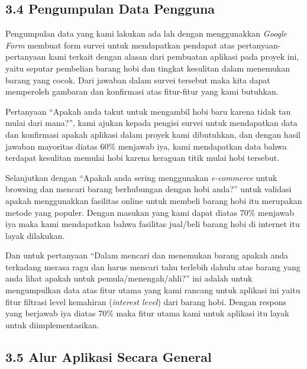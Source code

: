 \documentclass[a4paper]{article}
\begin{document}
\subsection*{3.4 Pengumpulan Data Pengguna}

Pengumpulan data yang kami lakukan ada lah dengan menggunakkan \textit{Google Form} membuat form survei untuk mendapatkan pendapat atas pertanyaan-pertanyaan kami terkait dengan alasan dari pembuatan aplikasi pada proyek ini, yaitu seputar pembelian barang hobi dan tingkat kesulitan dalam menemukan barang yang cocok. Dari jawaban dalam survei tersebut maka kita dapat memperoleh gambaran dan konfirmasi atas fitur-fitur yang kami butuhkan.


Pertanyaan “Apakah anda takut untuk mengambil hobi baru karena tidak tau mulai dari mana?”, kami ajukan kepada pengisi survei untuk mendapatkan data dan konfirmasi apakah aplikasi dalam proyek kami dibutuhkan, dan dengan hasil jawaban mayoritas diatas 60\% menjawab iya, kami mendapatkan data bahwa terdapat kesulitan memulai hobi karena keraguan titik mulai hobi tersebut.


Selanjutkan dengan “Apakah anda sering menggunakan \textit{e-commerce} untuk browsing dan mencari barang berhubungan dengan hobi anda?” untuk validasi apakah menggunakkan fasilitas online untuk membeli barang hobi itu merupakan metode yang populer. Dengan masukan yang kami dapat diatas 70\% menjawab iya maka kami mendapatkan bahwa fasilitas jual/beli barang hobi di internet itu layak dilakukan.


Dan untuk pertanyaan “Dalam mencari dan menemukan barang apakah anda terkadang merasa ragu dan harus mencari tahu terlebih dahulu atas barang yang anda lihat apakah untuk pemula/menengah/ahli?” ini adalah untuk mengumpulkan data atas fitur utama yang kami rancang untuk aplikasi ini yaitu fitur filtrasi level kemahiran (\textit{interest level}) dari barang hobi. Dengan respons yang berjawab iya diatas 70\% maka fitur utama kami untuk aplikasi itu layak untuk diimplementasikan.

\newpage
\subsection*{3.5 Alur Aplikasi Secara General}

\newpage
{}
\printbibliography[title=Referensi]
\end{document}
